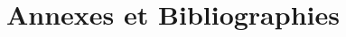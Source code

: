 


%


%


%
%


\appendix


\part{Annexes et Bibliographies} %

%


%
%


\label{app:bibliography} %

